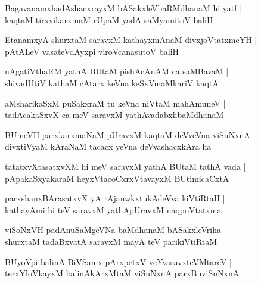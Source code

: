 \setcounter{shloka}{0}

\begin{shloka}
BagavanamxhadAshacxrayxM bASakxleVbaRMdhanaM hi yatf |\\ kaqtaM tirxvikarxmaM rUpaM yadA saMyamitoV baliH 
\end{shloka}

\begin{shloka}
EtanamxyA shurxtaM saravxM kathayxmAnaM divxjoVtatxmeYH |\\ pAtALeV vasateVdAyxpi viroVcanasutoV baliH
\end{shloka}

\begin{shloka}
nAgatiVthaRM yathA BUtaM pishAcAnAM ca saMBavaM |\\ shivadUtiV kathaM cAtarx keVna keSxVmaMkariV kaqtA
\end{shloka}

\begin{shloka}
aMsharikaSxM puSakxraM tu keVna niVtaM mahAmuneV |\\ tadAcakaSxvX ca meV saravxM yathAvadabxlibaMdhanaM 
\end{shloka}

\begin{shloka}
BUmeVH parxkarxmaNaM pUravxM kaqtaM deVveVna viSuNxnA |\\ divxtiVyaM kAraNaM tacacx yeVna deVvashacxkAra ha 
\end{shloka}

\begin{shloka}
tatatxvXtasatxvXM hi meV saravxM yathA BUtaM tathA vada |\\ pApakaSxyakaraM heyxVtacoCxrxVtavayxM BUtimicaCxtA
\end{shloka}

\begin{shloka}
parxshanxBArasatxvX yA rAjanwkxtukAdeVva kiVtiRtaH |\\
kathayAmi hi teV saravxM yathApUravxM naqpoVtatxma
\end{shloka}

\begin{shloka}
viSoNxVH padAnuSaMgeVNa baMdhanaM bASakxleVriha |\\
shurxtaM tadaBxvatA saravxM mayA teV parikiVtiRtaM
\end{shloka}

\begin{shloka}
BUyoVpi balinA BiVSamx pArxpetxV veYvasavxteVMtareV |\\ terxYloVkayxM balinAkArxMtaM viSuNxnA parxBuviSuNxnA 
\end{shloka}

